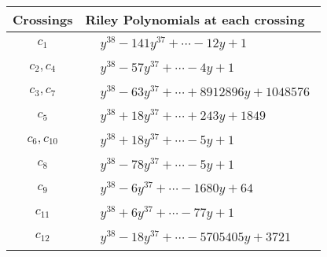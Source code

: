 \documentclass[1p]{elsarticle_modified}
\theoremstyle{definition}
\begin{document}
\begin{tabular}{m{50pt}|m{274pt}}
Crossings & \hspace{64pt}Riley Polynomials at each crossing \\
\hline $$\begin{aligned}c_{1}\end{aligned}$$&$\begin{aligned}
&y^{38}-141 y^{37}+\cdots-12 y+1
\end{aligned}$\\
\hline $$\begin{aligned}c_{2},c_{4}\end{aligned}$$&$\begin{aligned}
&y^{38}-57 y^{37}+\cdots-4 y+1
\end{aligned}$\\
\hline $$\begin{aligned}c_{3},c_{7}\end{aligned}$$&$\begin{aligned}
&y^{38}-63 y^{37}+\cdots+8912896 y+1048576
\end{aligned}$\\
\hline $$\begin{aligned}c_{5}\end{aligned}$$&$\begin{aligned}
&y^{38}+18 y^{37}+\cdots+243 y+1849
\end{aligned}$\\
\hline $$\begin{aligned}c_{6},c_{10}\end{aligned}$$&$\begin{aligned}
&y^{38}+18 y^{37}+\cdots-5 y+1
\end{aligned}$\\
\hline $$\begin{aligned}c_{8}\end{aligned}$$&$\begin{aligned}
&y^{38}-78 y^{37}+\cdots-5 y+1
\end{aligned}$\\
\hline $$\begin{aligned}c_{9}\end{aligned}$$&$\begin{aligned}
&y^{38}-6 y^{37}+\cdots-1680 y+64
\end{aligned}$\\
\hline $$\begin{aligned}c_{11}\end{aligned}$$&$\begin{aligned}
&y^{38}+6 y^{37}+\cdots-77 y+1
\end{aligned}$\\
\hline $$\begin{aligned}c_{12}\end{aligned}$$&$\begin{aligned}
&y^{38}-18 y^{37}+\cdots-5705405 y+3721
\end{aligned}$\\
\hline
\end{tabular}\\~\\
\end{document}
